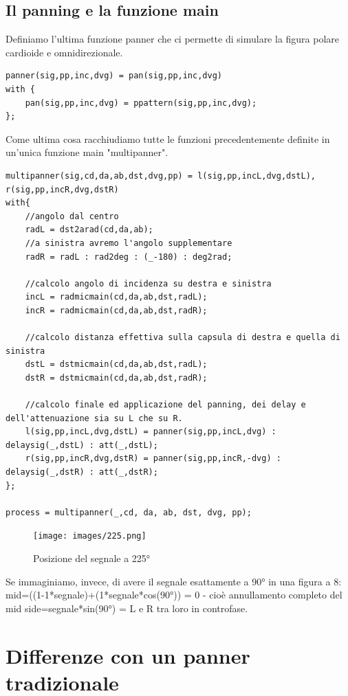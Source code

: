 \documentclass{article}
\begin{document}
\subsection{Il panning e la funzione main}
Definiamo l'ultima funzione panner che ci permette di simulare la figura polare cardioide e omnidirezionale. 
\begin{lstlisting}
panner(sig,pp,inc,dvg) = pan(sig,pp,inc,dvg)
with {
    pan(sig,pp,inc,dvg) = ppattern(sig,pp,inc,dvg); 
};
\end{lstlisting}

Come ultima cosa racchiudiamo tutte le funzioni precedentemente definite in un'unica funzione main "multipanner".

\begin{lstlisting}
multipanner(sig,cd,da,ab,dst,dvg,pp) = l(sig,pp,incL,dvg,dstL), r(sig,pp,incR,dvg,dstR)
with{
    //angolo dal centro
    radL = dst2arad(cd,da,ab);
    //a sinistra avremo l'angolo supplementare
    radR = radL : rad2deg : (_-180) : deg2rad;

    //calcolo angolo di incidenza su destra e sinistra
    incL = radmicmain(cd,da,ab,dst,radL);
    incR = radmicmain(cd,da,ab,dst,radR);

    //calcolo distanza effettiva sulla capsula di destra e quella di sinistra
    dstL = dstmicmain(cd,da,ab,dst,radL);
    dstR = dstmicmain(cd,da,ab,dst,radR);

    //calcolo finale ed applicazione del panning, dei delay e dell'attenuazione sia su L che su R.
    l(sig,pp,incL,dvg,dstL) = panner(sig,pp,incL,dvg) : delaysig(_,dstL) : att(_,dstL);
    r(sig,pp,incR,dvg,dstR) = panner(sig,pp,incR,-dvg) : delaysig(_,dstR) : att(_,dstR);
};

process = multipanner(_,cd, da, ab, dst, dvg, pp);
\end{lstlisting}
    \begin{figure}[H]
        \centering
        \texttt{[image: images/225.png]}
         \caption{\label{fig10}Posizione del segnale a 225°}
    \end{figure}

    Se immaginiamo, invece, di avere il segnale esattamente a 90° in una figura a 8: \\
    mid=((1-1*segnale)+(1*segnale*cos(90°)) = 0 - cioè annullamento completo del mid side=segnale*sin(90°) = L e R tra loro in controfase.

\section{Differenze con un panner tradizionale}
\end{document}
